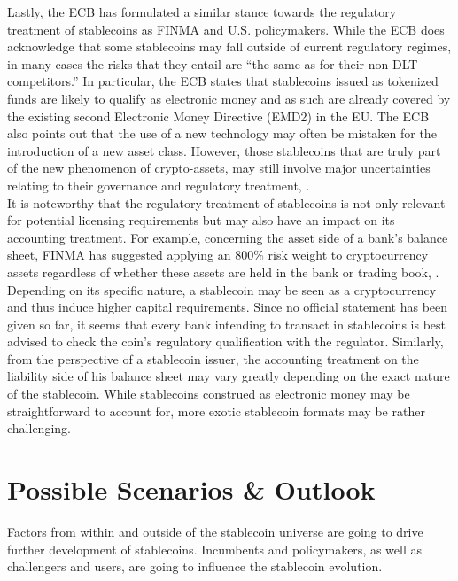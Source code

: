 \documentclass[conference]{IEEEtran}
\begin{document}
Lastly, the \ac{ECB} has formulated a similar stance towards the regulatory treatment of stablecoins as \ac{FINMA} and U.S. policymakers. While the \ac{ECB} does acknowledge that some stablecoins may fall outside of current regulatory regimes, in many cases the risks that they entail are ``the same as for their non-\ac{DLT} competitors.'' In particular, the \ac{ECB} states that stablecoins issued as tokenized funds are likely to qualify as electronic money and as such are already covered by the existing second Electronic Money Directive (EMD2) in the EU. The \ac{ECB} also points out that the use of a new technology may often be mistaken for the introduction of a new asset class. However, those stablecoins that are truly part of the new phenomenon of crypto-assets, may still involve major uncertainties relating to their governance and regulatory treatment, \cite{ECB}.\\

It is noteworthy that the regulatory treatment of stablecoins is not only relevant for potential licensing requirements but may also have an impact on its accounting treatment. For example, concerning the asset side of a bank's balance sheet, \ac{FINMA} has suggested applying an 800\% risk weight to cryptocurrency assets regardless of whether these assets are held in the bank or trading book, \cite{Mauchle}. Depending on its specific nature, a stablecoin may be seen as a cryptocurrency and thus induce higher capital requirements. Since no official statement has been given so far, it seems that every bank intending to transact in stablecoins is best advised to check the coin's regulatory qualification with the regulator. Similarly, from the perspective of a stablecoin issuer, the accounting treatment on the liability side of his balance sheet may vary greatly depending on the exact nature of the stablecoin. While stablecoins construed as electronic money may be straightforward to account for, more exotic stablecoin formats may be rather challenging.

\section{Possible Scenarios \& Outlook}
\label{sec:outlook}
Factors from within and outside of the stablecoin universe are going to drive further development of stablecoins. Incumbents and policymakers, as well as challengers and users, are going to influence the stablecoin evolution.\\
\end{document}

